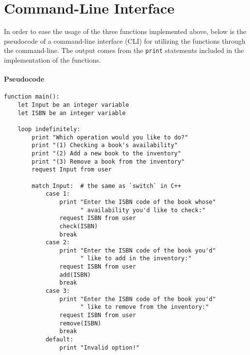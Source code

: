 \documentclass[12pt]{article}
\begin{document}
\pagebreak
\section{Command-Line Interface}

In order to ease the usage of the three functions implemented above, below is the pseudocode of a command-line interface (CLI) for utilizing the functions through the command-line. The output comes from the \texttt{print} statements included in the implementation of the functions.

\paragraph{Pseudocode}
\begin{verbatim}
function main():
    let Input be an integer variable
    let ISBN be an integer variable

    loop indefinitely:
        print "Which operation would you like to do?"
        print "(1) Checking a book's availability"
        print "(2) Add a new book to the inventory"
        print "(3) Remove a book from the inventory"
        request Input from user

        match Input:  # the same as `switch` in C++
            case 1:
                print "Enter the ISBN code of the book whose"
                      " availability you'd like to check:"
                request ISBN from user
                check(ISBN)
                break
            case 2:
                print "Enter the ISBN code of the book you'd"
                      " like to add in the inventory:"
                request ISBN from user
                add(ISBN)
                break
            case 3:
                print "Enter the ISBN code of the book you'd"
                      " like to remove from the inventory:"
                request ISBN from user
                remove(ISBN)
                break
            default:
                print "Invalid option!"
\end{verbatim}
\end{document}
